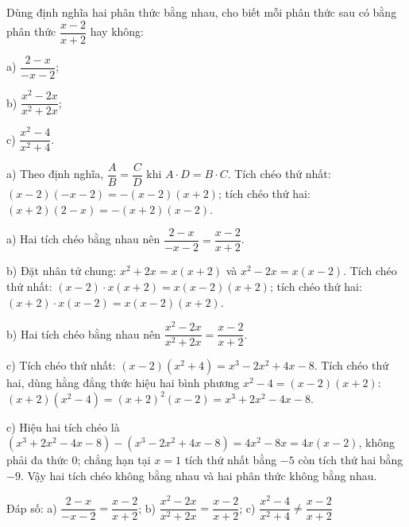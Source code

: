 \begin{problem}[8DS-PS-024]
Dùng định nghĩa hai phân thức bằng nhau, cho biết mỗi phân thức sau có bằng phân thức $\dfrac{x - 2}{x + 2}$ hay không:

a) $\dfrac{2 - x}{-x - 2}$;

b) $\dfrac{x^2 - 2x}{x^2 + 2x}$;

c) $\dfrac{x^2 - 4}{x^2 + 4}$.

\begin{solution}
a) Theo định nghĩa, $\dfrac{A}{B} = \dfrac{C}{D}$ khi $A \cdot D = B \cdot C$. Tích chéo thứ nhất: $(x - 2)(-x - 2) = -(x - 2)(x + 2)$; tích chéo thứ hai: $(x + 2)(2 - x) = -(x + 2)(x - 2)$.

a) Hai tích chéo bằng nhau nên $\dfrac{2 - x}{-x - 2} = \dfrac{x - 2}{x + 2}$.

b) Đặt nhân tử chung: $x^2 + 2x = x(x + 2)$ và $x^2 - 2x = x(x - 2)$. Tích chéo thứ nhất: $(x - 2) \cdot x(x + 2) = x(x - 2)(x + 2)$; tích chéo thứ hai: $(x + 2) \cdot x(x - 2) = x(x - 2)(x + 2)$.

b) Hai tích chéo bằng nhau nên $\dfrac{x^2 - 2x}{x^2 + 2x} = \dfrac{x - 2}{x + 2}$.

c) Tích chéo thứ nhất: $(x - 2)(x^2 + 4) = x^3 - 2x^2 + 4x - 8$. Tích chéo thứ hai, dùng hằng đẳng thức hiệu hai bình phương $x^2 - 4 = (x - 2)(x + 2)$: $(x + 2)(x^2 - 4) = (x + 2)^2(x - 2) = x^3 + 2x^2 - 4x - 8$.

c) Hiệu hai tích chéo là $(x^3 + 2x^2 - 4x - 8) - (x^3 - 2x^2 + 4x - 8) = 4x^2 - 8x = 4x(x - 2)$, không phải đa thức $0$; chẳng hạn tại $x = 1$ tích thứ nhất bằng $-5$ còn tích thứ hai bằng $-9$. Vậy hai tích chéo không bằng nhau và hai phân thức không bằng nhau.

Đáp số: a) $\boxed{\dfrac{2 - x}{-x - 2} = \dfrac{x - 2}{x + 2}}$; b) $\boxed{\dfrac{x^2 - 2x}{x^2 + 2x} = \dfrac{x - 2}{x + 2}}$; c) $\boxed{\dfrac{x^2 - 4}{x^2 + 4} \neq \dfrac{x - 2}{x + 2}}$
\end{solution}
\end{problem}

